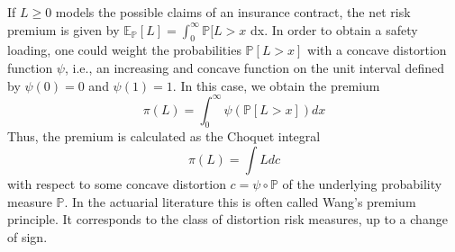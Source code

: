 If \(L \geq 0\) models the possible claims of an insurance contract, the net risk premium is given by
\(\mathbb{E}_{\mathbb{P}}[L] = \int_0^{\infty} \mathbb{P}[L>x\) dx.
In order to obtain a safety loading, one could weight the probabilities \(\mathbb{P}[L>x]\) with a concave distortion function \(\psi\), i.e., an increasing and concave function on the unit interval defined by \(\psi(0)=0\) and \(\psi(1)=1\).
In this case, we obtain the premium
\[\pi(L) = \int_0^{\infty} \psi(\mathbb{P}[L>x]) dx\]
Thus, the premium is calculated as the Choquet integral
\[\pi(L) = \int L dc\]
with respect to some concave distortion \(c = \psi \circ \mathbb{P}\) of the underlying probability measure \(\mathbb{P}\).
In the actuarial literature this is often called Wang's premium principle. 
It corresponds to the class of distortion risk measures, up to a change of sign.
